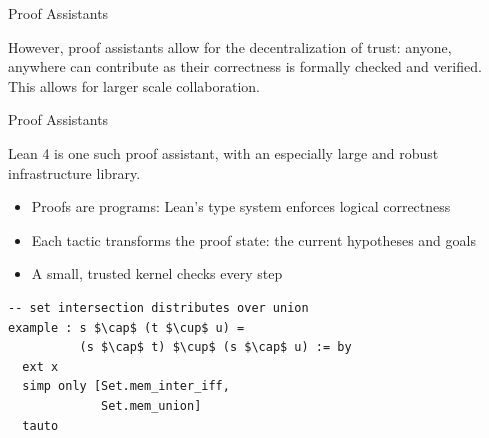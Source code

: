 \documentclass{beamer}
\begin{document}
\begin{frame}{Proof Assistants}

However, proof assistants allow for the decentralization of trust: anyone, anywhere can contribute as their correctness is formally checked and verified. This allows for larger scale collaboration.


\end{frame}




\begin{frame}[fragile]{Proof Assistants}

Lean 4 is one such proof assistant, with an especially large and robust infrastructure library.



\begin{itemize}
  \item Proofs are programs: Lean's type system enforces logical correctness
  \item Each tactic transforms the proof state: the current hypotheses and goals
  \item A small, trusted kernel checks every step
\end{itemize}

\vspace{1em}
\begin{lstlisting}
-- set intersection distributes over union
example : s $\cap$ (t $\cup$ u) =
          (s $\cap$ t) $\cup$ (s $\cap$ u) := by
  ext x
  simp only [Set.mem_inter_iff,
             Set.mem_union]
  tauto
\end{lstlisting}





\end{frame}
\end{document}

